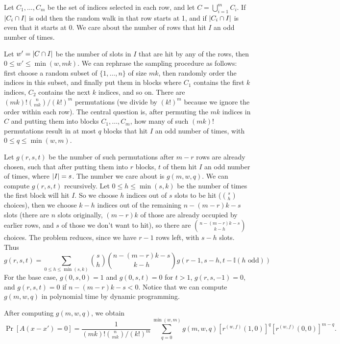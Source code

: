 \documentclass[11pt]{article}
\begin{document}
Let $C_1, \dots, C_m$ be the set of indices selected in each row, and let $C =
\bigcup_{i=1}^m C_i$.
If $\left\lvert C_i \cap I\right\rvert$ is odd then the random walk in that row starts at 1, and if
$\left\lvert C_i \cap I\right\rvert$ is even that it starts at 0.
We care about the number of rows that hit $I$ an odd number of times.

Let $w' = \left\lvert C \cap I\right\rvert$ be the number of slots in $I$ that are hit by any of the
rows, then $0 \leq w' \leq \min(w, mk)$.
We can rephrase the sampling procedure as follows: first choose a random subset
of $\{ 1, \dots, n \}$ of size $mk$, then randomly order the indices in this
subset, and finally put them in blocks where $C_1$ contains the first $k$
indices, $C_2$ contains the next $k$ indices, and so on.
There are $(mk)! 
\binom{n}{mk} / (k!)^m$ permutations (we divide by $(k!)^m$ because we ignore
the order within each row).
The central question is, after permuting the $mk$ indices in $C$ and putting
them into blocks $C_1, \dots, C_m$, how many of such $(mk)!$ permutations result
in at most $q$ blocks that hit $I$ an odd number of times, with $0 \leq q \leq
\min(w, m)$.

Let $g(r, s, t)$ be the number of such permutations after $m - r$ rows are
already chosen, such that after putting them into $r$ blocks, $t$ of them hit
$I$ an odd number of times, where $\left\lvert I\right\rvert = s$.
The number we care about is $g(m, w, q)$.
We can compute $g(r, s, t)$ recursively.
Let $0 \leq h \leq \min(s, k)$ be the number of times the first block will hit $I$.
So we choose $h$ indices out of $s$ slots to be hit ($\binom{s}{h}$ choices),
then we choose $k - h$ indices out of the remaining $n - (m - r)k - s$ slots
(there are $n$ slots originally, $(m - r)k$ of those are already occupied by
earlier rows, and $s$ of those we don't want to hit), so there are $\binom{n -
  (m - r)k - s}{k - h}$ choices.
The problem reduces, since we have $r - 1$ rows left, with $s - h$ slots.
Thus
\begin{equation*}
  g(r, s, t) = \sum_{0 \leq h \leq \min(s, k)} \binom{s}{h}
  \binom{n - (m - r)k - s}{k - h} g(r-1, s-h,
  t-\mathbb{I}(h \text{ odd})) 
\end{equation*}
For the base case, $g(0, s, 0) = 1$ and $g(0, s, t) = 0$ for $t > 1$, $g(r, s,
-1) = 0$, and $g(r, s, t) = 0$ if $n - (m - r)k - s < 0$.
Notice that we can compute $g(m, w, q)$ in polynomial time by dynamic
programming.

After computing $g(m, w, q)$, we obtain
\begin{equation*}
  \Pr[A(x - x') = 0] = \frac{1}{(mk)! \binom{n}{mk} / (k!)^m}
  \sum_{q=0}^{\min(w, m)} g(m, w, q) [r^{(w, f)}(1, 0)]^q [r^{(w, f)}(0, 0)]^{m-q}.
  \label{eq:k_large_with_replacement}
\end{equation*}


\end{document}
